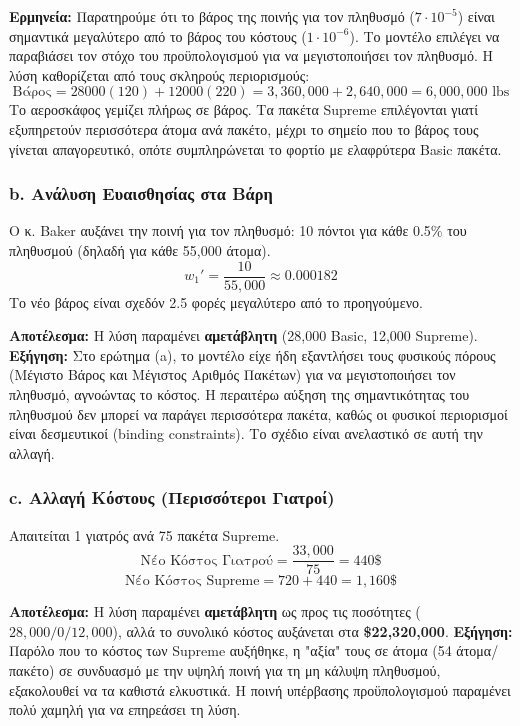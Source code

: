 \documentclass[12pt, a4paper]{article}
\begin{document}
\textbf{Ερμηνεία:}
Παρατηρούμε ότι το βάρος της ποινής για τον πληθυσμό ($7 \cdot 10^{-5}$) είναι σημαντικά μεγαλύτερο από το βάρος του κόστους ($1 \cdot 10^{-6}$). Το μοντέλο επιλέγει να παραβιάσει τον στόχο του προϋπολογισμού για να μεγιστοποιήσει τον πληθυσμό.
Η λύση καθορίζεται από τους σκληρούς περιορισμούς:
$$ \text{Βάρος} = 28000(120) + 12000(220) = 3,360,000 + 2,640,000 = 6,000,000 \text{ lbs} $$
Το αεροσκάφος γεμίζει πλήρως σε βάρος. Τα πακέτα Supreme επιλέγονται γιατί εξυπηρετούν περισσότερα άτομα ανά πακέτο, μέχρι το σημείο που το βάρος τους γίνεται απαγορευτικό, οπότε συμπληρώνεται το φορτίο με ελαφρύτερα Basic πακέτα.

\subsubsection*{b. Ανάλυση Ευαισθησίας στα Βάρη}
Ο κ. Baker αυξάνει την ποινή για τον πληθυσμό: 10 πόντοι για κάθε 0.5\% του πληθυσμού (δηλαδή για κάθε 55,000 άτομα).
$$ w_1' = \frac{10}{55,000} \approx 0.000182 $$
Το νέο βάρος είναι σχεδόν 2.5 φορές μεγαλύτερο από το προηγούμενο.

\textbf{Αποτέλεσμα:} Η λύση παραμένει \textbf{αμετάβλητη} (28,000 Basic, 12,000 Supreme).
\textbf{Εξήγηση:} Στο ερώτημα (a), το μοντέλο είχε ήδη εξαντλήσει τους φυσικούς πόρους (Μέγιστο Βάρος και Μέγιστος Αριθμός Πακέτων) για να μεγιστοποιήσει τον πληθυσμό, αγνοώντας το κόστος. Η περαιτέρω αύξηση της σημαντικότητας του πληθυσμού δεν μπορεί να παράγει περισσότερα πακέτα, καθώς οι φυσικοί περιορισμοί είναι δεσμευτικοί (binding constraints). Το σχέδιο είναι ανελαστικό σε αυτή την αλλαγή.

\subsubsection*{c. Αλλαγή Κόστους (Περισσότεροι Γιατροί)}
Απαιτείται 1 γιατρός ανά 75 πακέτα Supreme.
$$ \text{Νέο Κόστος Γιατρού} = \frac{33,000}{75} = 440 \$ $$
$$ \text{Νέο Κόστος Supreme} = 720 + 440 = 1,160 \$ $$

\textbf{Αποτέλεσμα:} Η λύση παραμένει \textbf{αμετάβλητη} ως προς τις ποσότητες ($28,000 / 0 / 12,000$), αλλά το συνολικό κόστος αυξάνεται στα \textbf{\$22,320,000}.
\textbf{Εξήγηση:} Παρόλο που το κόστος των Supreme αυξήθηκε, η "αξία" τους σε άτομα (54 άτομα/πακέτο) σε συνδυασμό με την υψηλή ποινή για τη μη κάλυψη πληθυσμού, εξακολουθεί να τα καθιστά ελκυστικά. Η ποινή υπέρβασης προϋπολογισμού παραμένει πολύ χαμηλή για να επηρεάσει τη λύση.
\end{document}
